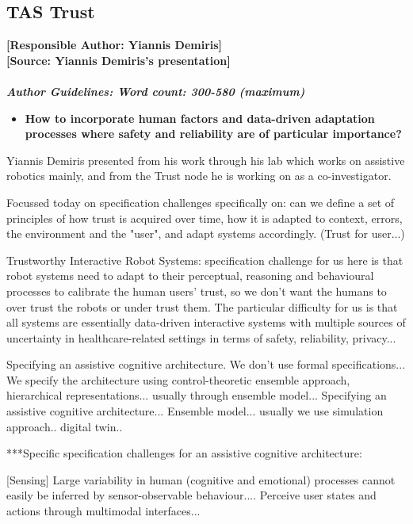 \documentclass[sigconf]{acmart}
\begin{document}
\subsection{TAS Trust}
\noindent\textbf{[Responsible Author:  Yiannis Demiris]}\\
\noindent\textbf{[Source: Yiannis Demiris's presentation]}\\\\
\noindent\textbf{\textit{Author Guidelines: Word count: 300-580 (maximum)}}\\
\begin{itemize}
	\item \textbf{How to incorporate human factors and data-driven adaptation processes where safety and reliability are of particular importance?}
\end{itemize}
Yiannis Demiris presented from his work through his lab which works on assistive robotics mainly, and from the Trust node he is working on as a co-investigator.

Focussed today on specification challenges specifically on: can we define a set of principles of how trust is acquired over time,  how it is adapted to context, errors, the environment and the "user", and adapt systems accordingly. (Trust for user...)

Trustworthy Interactive Robot Systems: specification challenge for us here is that robot systems need to adapt to their perceptual, reasoning and behavioural processes to calibrate the human users' trust, so we don't want the humans to over trust the robots or under trust them. The particular difficulty for us is that all systems are essentially data-driven interactive systems with multiple sources of uncertainty in healthcare-related settings in terms of safety, reliability, privacy...

Specifying an assistive cognitive architecture.
We don't use formal specifications...
We specify the architecture using control-theoretic ensemble approach, hierarchical representations...
usually through ensemble model...
Specifying an assistive cognitive architecture... Ensemble model...
usually we use simulation approach.. digital twin..

***Specific specification challenges for an assistive cognitive architecture:

[Sensing] Large variability in human (cognitive and emotional) processes cannot easily be inferred by sensor-observable behaviour....
Perceive user states and actions through multimodal interfaces...
\end{document}
